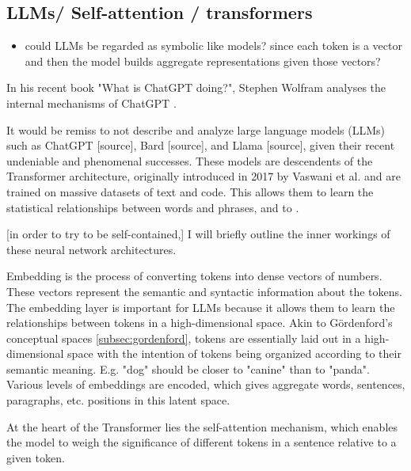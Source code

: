 \subsection{LLMs/ Self-attention / transformers}

\begin{itemize}
    \item could LLMs be regarded as symbolic like models? since each token is a vector and then the model builds aggregate representations given those vectors?
\end{itemize}

In his recent book "What is ChatGPT doing?", Stephen Wolfram analyses the internal mechanisms of ChatGPT \cite{wolfram2023chatgpt}.

It would be remiss to not describe and analyze large language models (LLMs) such as ChatGPT [source], Bard [source], and Llama [source], given their recent undeniable and phenomenal successes. These models are descendents of the Transformer architecture, originally introduced in 2017 by Vaswani et al. \cite{Vaswani_Shazeer_Parmar_Uszkoreit_Jones_Gomez_Kaiser_Polosukhin_2017} and are trained on massive datasets of text and code. This allows them to learn the statistical relationships between words and phrases, and to .

[in order to try to be self-contained,] I will briefly outline the inner workings of these neural network architectures. 

Embedding is the process of converting tokens into dense vectors of numbers. These vectors represent the semantic and syntactic information about the tokens. The embedding layer is important for LLMs because it allows them to learn the relationships between tokens in a high-dimensional space.
Akin to Gördenford's conceptual spaces \ref{subsec:gordenford}, tokens are essentially laid out in a high-dimensional space with the intention of tokens being organized according to their semantic meaning. E.g. "dog" should be closer to "canine" than to "panda". 
Various levels of embeddings are encoded, which gives aggregate words, sentences, paragraphs, etc. positions in this latent space.

At the heart of the Transformer lies the self-attention mechanism, which enables the model to weigh the significance of different tokens in a sentence relative to a given token.

